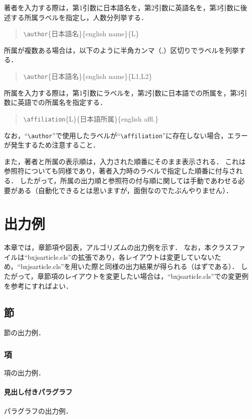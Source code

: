 \documentclass[lualatex]{ipsj}
\begin{document}
  著者を入力する際は，第1引数に日本語名を，第2引数に英語名を，第3引数に後述する所属ラベルを指定し，人数分列挙する．
    \begin{quote}
    \texttt{\textbackslash author}\{日本語名\}\{english name\}\{L\}
    \end{quote}
  所属が複数ある場合は，以下のように半角カンマ（,）区切りでラベルを列挙する．
    \begin{quote}
    \texttt{\textbackslash author}\{日本語名\}\{english name\}\{L1,L2\}
    \end{quote}

  所属を入力する際は，第1引数にラベルを，第2引数に日本語での所属を，第3引数に英語での所属名を指定する．
    \begin{quote}
    \texttt{\textbackslash affiliation}\{L\}\{日本語所属\}\{english affl.\}
    \end{quote}
  なお，``\texttt{\textbackslash author}''で使用したラベルが``\texttt{\textbackslash affiliation}''に存在しない場合，エラーが発生するため注意すること．

  また，著者と所属の表示順は，入力された順番にそのまま表示される．
  これは参照符についても同様であり，著者入力時のラベルで指定した順番に付与される．
  したがって，所属の出力順と参照符の付与順に関しては手動であわせる必要がある（自動化できるとは思いますが，面倒なのでたぶんやりません）．


\section{出力例}
本章では，章節項や図表，アルゴリズムの出力例を示す．
なお，本クラスファイルは``bxjsarticle.cls''の拡張であり，各レイアウトは変更していないため，``bxjsarticle.cls''を用いた際と同様の出力結果が得られる（はずである）．
したがって，章節項のレイアウトを変更したい場合は，``bxjsarticle.cls''での変更例を参考にすればよい．

  \subsection{節}
  節の出力例．

    \subsubsection{項}
    項の出力例．

      \paragraph{見出し付きパラグラフ}
      パラグラフの出力例．
  
\end{document}
